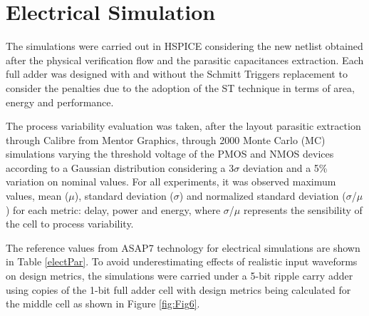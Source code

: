 \documentclass[ecp,tc, english]{iiufrgs}
\begin{document}
\section{Electrical Simulation}

The simulations were carried out in HSPICE considering the new netlist obtained after the physical verification flow and the parasitic capacitances extraction. Each full adder was designed with and without the Schmitt Triggers replacement to consider the penalties due to the adoption of the ST technique in terms of area, energy and performance.

The process variability evaluation was taken, after the layout parasitic extraction through Calibre\textregistered{} from Mentor Graphics, through 2000 Monte Carlo (MC) simulations varying the threshold voltage of the PMOS and NMOS devices according to a Gaussian distribution considering a 3\(\sigma\) deviation and a 5\% variation on nominal values. For all experiments, it was observed maximum values, mean (\(\mu\)), standard deviation (\(\sigma\)) and normalized standard deviation (\(\sigma\)/\(\mu\)) for each metric: delay, power and energy, where \(\sigma\)/\(\mu\) represents the sensibility of the cell to process variability. 

The reference values from ASAP7 technology for electrical simulations are shown in Table \ref{electPar}. To avoid underestimating effects of realistic input waveforms on design metrics, the simulations were carried under a 5-bit ripple carry adder using copies of the 1-bit full adder cell with design metrics being calculated for the middle cell as shown in Figure \ref{fig:Fig6}. 
\end{document}
